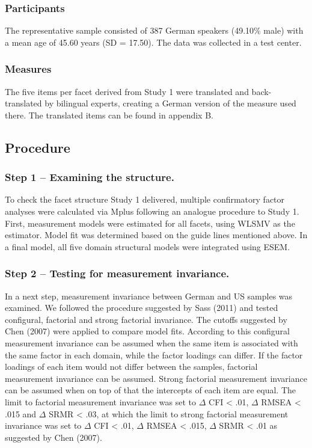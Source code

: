 \documentclass[,man,floatsintext]{apa6}
\begin{document}
\subsubsection{Participants}\label{participants-1}

The representative sample consisted of 387 German speakers (49.10\%
male) with a mean age of 45.60 years (SD = 17.50). The data was
collected in a test center.

\subsubsection{Measures}\label{measures-1}

The five items per facet derived from Study 1 were translated and
back-translated by bilingual experts, creating a German version of the
measure used there. The translated items can be found in appendix B.

\subsection{Procedure}\label{procedure-1}

\subsubsection{Step 1 -- Examining the
structure.}\label{step-1-examining-the-structure.}

To check the facet structure Study 1 delivered, multiple confirmatory
factor analyses were calculated via Mplus following an analogue
procedure to Study 1. First, measurement models were estimated for all
facets, using WLSMV as the estimator. Model fit was determined based on
the guide lines mentioned above. In a final model, all five domain
structural models were integrated using ESEM.

\subsubsection{Step 2 -- Testing for measurement
invariance.}\label{step-2-testing-for-measurement-invariance.}

In a next step, measurement invariance between German and US samples was
examined. We followed the procedure suggested by Sass (2011) and tested
configural, factorial and strong factorial invariance. The cutoffs
suggested by Chen (2007) were applied to compare model fits. According
to this configural measurement invariance can be assumed when the same
item is associated with the same factor in each domain, while the factor
loadings can differ. If the factor loadings of each item would not
differ between the samples, factorial measurement invariance can be
assumed. Strong factorial measurement invariance can be assumed when on
top of that the intercepts of each item are equal. The limit to
factorial measurement invariance was set to \(\Delta\) CFI \textless{}
.01, \(\Delta\) RMSEA \textless{} .015 and \(\Delta\) SRMR \textless{}
.03, at which the limit to strong factorial measurement invariance was
set to \(\Delta\) CFI \textless{} .01, \(\Delta\) RMSEA \textless{}
.015, \(\Delta\) SRMR \textless{} .01 as suggested by Chen (2007).
\end{document}
